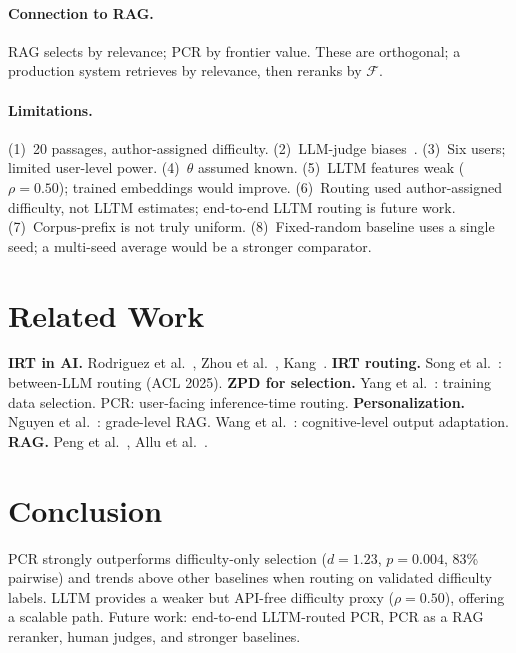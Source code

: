 \documentclass[11pt]{article}
\begin{document}
\paragraph{Connection to RAG.}
RAG selects by relevance; PCR by frontier value.
These are orthogonal; a production system retrieves by relevance, then reranks by $\mathcal{F}$.

\paragraph{Limitations.}
(1)~20 passages, author-assigned difficulty.
(2)~LLM-judge biases~\citep{zheng2023judging}.
(3)~Six users; limited user-level power.
(4)~$\theta$ assumed known.
(5)~LLTM features weak ($\rho = 0.50$); trained embeddings would improve.
(6)~Routing used author-assigned difficulty, not LLTM estimates; end-to-end LLTM routing is future work.
(7)~Corpus-prefix is not truly uniform.
(8)~Fixed-random baseline uses a single seed; a multi-seed average would be a stronger comparator.

\section{Related Work}

\textbf{IRT in AI.}
Rodriguez et al.~\citep{rodriguez2021evaluation}, Zhou et al.~\citep{zhou2026psnirt}, Kang~\citep{kang2026efsl}.
\textbf{IRT routing.}
Song et al.~\citep{song2025irtrouter}: between-LLM routing (ACL 2025).
\textbf{ZPD for selection.}
Yang et al.~\citep{yang2026zpd}: training data selection.
PCR: user-facing inference-time routing.
\textbf{Personalization.}
Nguyen et al.~\citep{nguyen2026pragedu}: grade-level RAG.
Wang et al.~\citep{wang2025claf}: cognitive-level output adaptation.
\textbf{RAG.}
Peng et al.~\citep{peng2026adagres}, Allu et al.~\citep{allu2026wrac}.

\section{Conclusion}

PCR strongly outperforms difficulty-only selection ($d = 1.23$, $p = 0.004$, 83\% pairwise) and trends above other baselines when routing on validated difficulty labels.
LLTM provides a weaker but API-free difficulty proxy ($\rho = 0.50$), offering a scalable path.
Future work: end-to-end LLTM-routed PCR, PCR as a RAG reranker, human judges, and stronger baselines.
\end{document}
